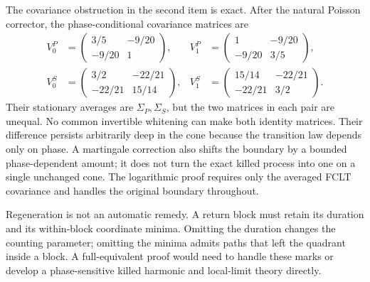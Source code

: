 \documentclass[11pt,letterpaper]{article}
\numberwithin{equation}{section}
\theoremstyle{remark}\newtheorem{remark}[theorem]{Remark}
\begin{document}
The covariance obstruction in the second item is exact. After the
natural Poisson corrector, the phase-conditional covariance matrices
are
\begin{align*}
 V^P_0&=\begin{pmatrix}3/5&-9/20\\-9/20&1\end{pmatrix},&
 V^P_1&=\begin{pmatrix}1&-9/20\\-9/20&3/5\end{pmatrix},\\
 V^S_0&=\begin{pmatrix}3/2&-22/21\\-22/21&15/14\end{pmatrix},&
 V^S_1&=\begin{pmatrix}15/14&-22/21\\-22/21&3/2\end{pmatrix}.
\end{align*}
Their stationary averages are $\Sigma_P,\Sigma_S$, but the two
matrices in each pair are unequal. No common invertible whitening
can make both identity matrices. Their difference persists
arbitrarily deep in the cone because the transition law depends only
on phase. A martingale correction also shifts the boundary by a
bounded phase-dependent amount; it does not turn the exact killed
process into one on a single unchanged cone. The logarithmic proof
requires only the averaged FCLT covariance and handles the original
boundary throughout.

Regeneration is not an automatic remedy. A return block must retain
its duration and its within-block coordinate minima. Omitting the
duration changes the counting parameter; omitting the minima admits
paths that left the quadrant inside a block. A full-equivalent proof
would need to handle these marks or develop a phase-sensitive killed
harmonic and local-limit theory directly.
\end{document}
